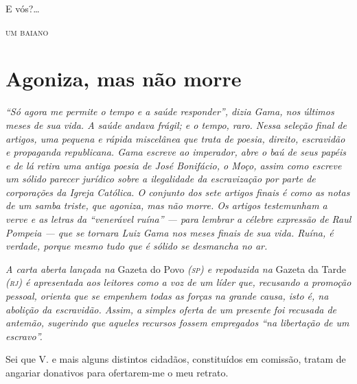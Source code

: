 E vós?\ldots{}

\medskip
\hfill\textsc{um baiano}

\part{Agoniza, mas não morre}

\begin{didas}
\emph{``Só agora me permite o tempo e a saúde responder'', dizia Gama, nos
últimos meses de sua vida. A saúde andava frágil; e o tempo, raro. Nessa
seleção final de artigos, uma pequena e rápida miscelânea que trata de
poesia, direito, escravidão e propaganda republicana. Gama escreve ao
imperador, abre o baú de seus papéis e de lá retira uma antiga poesia de
José Bonifácio, o Moço, assim como escreve um sólido parecer jurídico
sobre a ilegalidade da escravização por parte de corporações
da Igreja Católica. O conjunto dos sete artigos finais é como as notas
de um samba triste, que agoniza, mas não morre. Os artigos testemunham a
verve e as letras da ``venerável ruína'' --- para lembrar a célebre
expressão de Raul Pompeia --- que se tornara Luiz Gama nos meses finais
de sua vida. Ruína, é verdade, porque mesmo tudo que é sólido se
desmancha no ar.}
\end{didas}



\begin{resumo}
\emph{A carta aberta lançada na} Gazeta do Povo \emph{(\textsc{sp}) e repoduzida
na} Gazeta da Tarde \emph{(\textsc{rj}) é apresentada aos leitores como a voz de
um líder que, recusando a promoção pessoal, orienta que se empenhem todas
as forças na grande causa, isto é, na abolição da escravidão. Assim, a
simples oferta de um presente foi recusada de antemão, sugerindo que
aqueles recursos fossem empregados ``na libertação de um escravo''. }
\end{resumo}

Sei que V. e mais alguns distintos cidadãos, constituídos em comissão, tratam de angariar donativos para ofertarem-me o meu retrato.

